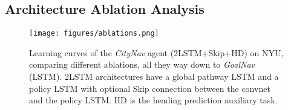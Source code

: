 \subsection{Architecture Ablation Analysis}
\label{supp:ablation}

\begin{figure}[ht]
\begin{center}
\centerline{\texttt{[image: figures/ablations.png]}}
\caption{Learning curves of the \emph{CityNav} agent (2LSTM+Skip+HD) on NYU, comparing different ablations, all they way down to \emph{GoalNav} (LSTM). 2LSTM architectures have a global pathway LSTM and a policy LSTM with optional Skip connection between the convnet and the policy LSTM. HD is the heading prediction auxiliary task.
}
\label{fig:ablations}
\end{center}
\vskip -0.2in
\end{figure}

